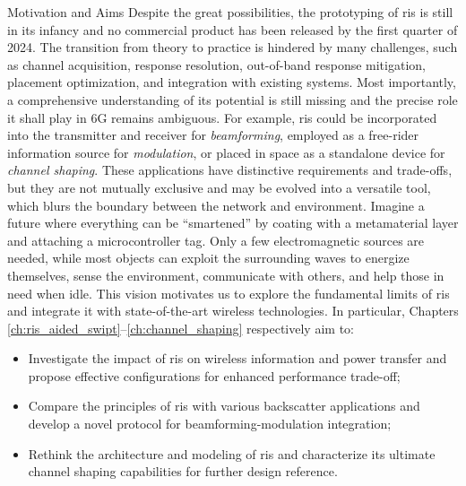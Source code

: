 \begin{section}{Motivation and Aims}
	Despite the great possibilities, the prototyping of \gls{ris} is still in its infancy and no commercial product has been released by the first quarter of 2024.
	The transition from theory to practice is hindered by many challenges, such as channel acquisition, response resolution, out-of-band response mitigation, placement optimization, and integration with existing systems.
	Most importantly, a comprehensive understanding of its potential is still missing and the precise role it shall play in 6G remains ambiguous.
	For example, \gls{ris} could be incorporated into the transmitter and receiver for \emph{beamforming}, employed as a free-rider information source for \emph{modulation}, or placed in space as a standalone device for \emph{channel shaping}.
	These applications have distinctive requirements and trade-offs, but they are not mutually exclusive and may be evolved into a versatile tool, which blurs the boundary between the network and environment.
	Imagine a future where everything can be ``smartened'' by coating with a metamaterial layer and attaching a microcontroller tag.
	Only a few electromagnetic sources are needed, while most objects can exploit the surrounding waves to energize themselves, sense the environment, communicate with others, and help those in need when idle.
	This vision motivates us to explore the fundamental limits of \gls{ris} and integrate it with state-of-the-art wireless technologies.
	In particular, Chapters \ref{ch:ris_aided_swipt}--\ref{ch:channel_shaping} respectively aim to:
	\begin{itemize}
		\item Investigate the impact of \gls{ris} on wireless information and power transfer and propose effective configurations for enhanced performance trade-off;
		\item Compare the principles of \gls{ris} with various backscatter applications and develop a novel protocol for beamforming-modulation integration;
		\item Rethink the architecture and modeling of \gls{ris} and characterize its ultimate channel shaping capabilities for further design reference.
	\end{itemize}
\end{section}


